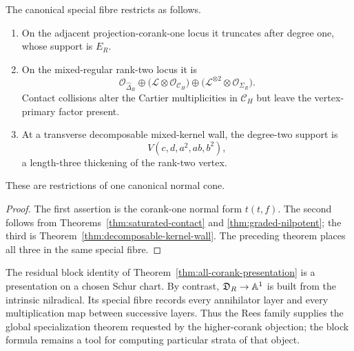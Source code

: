 \begin{corollary}
\label{cor:three-boundary-regimes}
The canonical special fibre restricts as follows.
\begin{enumerate}
\item On the adjacent projection-corank-one locus it truncates after
degree one, whose support is \(E_R\).
\item On the mixed-regular rank-two locus it is
\[
 \mathcal O_{\widehat\Delta_R}
 \oplus
 \bigl(\mathcal L\otimes\mathcal O_{\mathcal C_H}\bigr)
 \oplus
 \bigl(\mathcal L^{\otimes2}\otimes\mathcal O_{\Sigma_R}\bigr).
\]
Contact collisions alter the Cartier multiplicities in
\(\mathcal C_H\) but leave the vertex-primary factor present.
\item At a transverse decomposable mixed-kernel wall, the degree-two
support is
\[
 V(c,d,a^2,ab,b^2),
\]
a length-three thickening of the rank-two vertex.
\end{enumerate}
These are restrictions of one canonical normal cone.
\end{corollary}

\begin{proof}
The first assertion is the corank-one normal form \(t(t,f)\). The
second follows from Theorems~\ref{thm:saturated-contact} and
\ref{thm:graded-nilpotent}; the third is
Theorem~\ref{thm:decomposable-kernel-wall}. The preceding theorem
places all three in the same special fibre.
\end{proof}

\begin{remark}
The residual block identity of
Theorem~\ref{thm:all-corank-presentation} is a presentation on a
chosen Schur chart. By contrast, \(\mathfrak D_R\to\mathbb A^1\) is built
from the intrinsic nilradical. Its special fibre records every
annihilator layer and every multiplication map between successive
layers. Thus the Rees family supplies the global specialization
theorem requested by the higher-corank objection; the block formula
remains a tool for computing particular strata of that object.
\end{remark}
